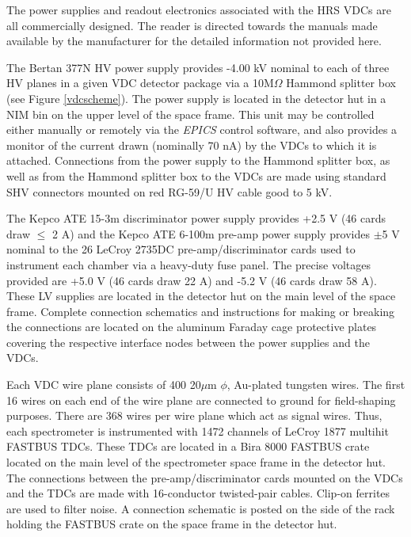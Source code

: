The power supplies and readout electronics associated with the HRS
VDCs are all commercially designed.  The reader is directed towards
the manuals made available by the manufacturer for the detailed
information not provided here.

The Bertan 377N HV power supply provides -4.00 kV nominal to
each of three HV planes in a given VDC detector package via a
10M$\Omega$ Hammond splitter box (see Figure \ref{vdcscheme}).
The power supply is located in
the detector hut in a NIM bin on the upper level of the space frame.
This unit may be controlled either manually or remotely via the
{\it EPICS} control software, and also provides a monitor of the
current drawn (nominally 70 nA) by the VDCs to which it is attached.
Connections from the power supply to the Hammond splitter box, as
well as from the Hammond splitter box to the VDCs are made using
standard SHV connectors mounted on red RG-59/U HV cable good to 5 kV.


The Kepco ATE 15-3m discriminator power supply provides +2.5 V (46 cards
draw $\leq$ 2 A)
and the Kepco ATE 6-100m pre-amp power supply provides $\pm$5 V nominal
to the 26 LeCroy 2735DC pre-amp/discriminator cards used to instrument 
each chamber via a heavy-duty fuse panel.  The precise voltages provided
are +5.0 V (46 cards draw 22 A) and -5.2 V (46 cards draw 58 A).  These
LV supplies are
located in the detector hut on the main level
of the space frame.  Complete connection schematics and instructions
for making or breaking the connections are located on the aluminum
Faraday cage protective plates covering the respective interface
nodes between the power supplies and the VDCs.

Each VDC wire plane consists of 400 20$\mu$m $\phi$, Au-plated
tungsten wires.  The first 16 wires on each end of the wire plane
are connected to ground for field-shaping purposes.  There are
368 wires per wire plane which act as signal wires.  Thus, each
spectrometer is instrumented with 1472 channels of LeCroy 1877
multihit FASTBUS TDCs.  These TDCs are located in a Bira 8000 FASTBUS
crate located on the main level of the spectrometer space frame in
the detector hut.  The connections between the pre-amp/discriminator
cards mounted on the VDCs and the TDCs are made with 16-conductor
twisted-pair cables.  Clip-on ferrites are used to filter noise.
A connection schematic is posted on the side of the rack holding
the FASTBUS crate on the space frame in the detector hut.

